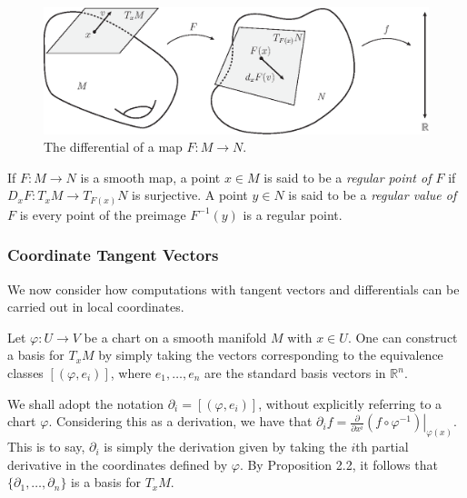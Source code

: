 \begin{figure}[h!]
\centering
\includegraphics[scale=0.75]{fig/differential-1b}
\caption{The differential of a map $F:M\to N$.}
\label{fig:diff-1}
\end{figure}
\begin{definition}
If $F:M\to N$ is a smooth map, a point $x\in M$ is said to be a \textit{regular point of $F$} if $D_xF:T_xM\to T_{F(x)}N$ is surjective. A point $y\in N$ is said to be a \textit{regular value of $F$} is every point of the preimage $F^{-1}(y)$ is a regular point.
\end{definition}
\subsubsection{Coordinate Tangent Vectors}
We now consider how computations with tangent vectors and differentials can be carried out in local coordinates.

Let $\varphi:U\to V$ be a chart on a smooth manifold $M$ with $x\in U$. One can construct a basis for $T_xM$ by simply taking the vectors corresponding to the equivalence classes $[(\varphi,e_i)]$, where $e_1,\ldots,e_n$ are the standard basis vectors in $\mathbb{R}^n$. 

We shall adopt the notation $\partial_i=[(\varphi,e_i)]$, without explicitly referring to a chart $\varphi$. Considering this as a derivation, we have that $\partial_if=\left.\frac{\partial}{\partial x^i}(f\circ\varphi^{-1})\right\rvert_{\varphi(x)}$. This is to say, $\partial_i$ is simply the derivation given by taking the $i$th partial derivative in the coordinates defined by $\varphi$. By Proposition 2.2, it follows that $\{\partial_1,\ldots,\partial_n\}$ is a basis for $T_xM$.
